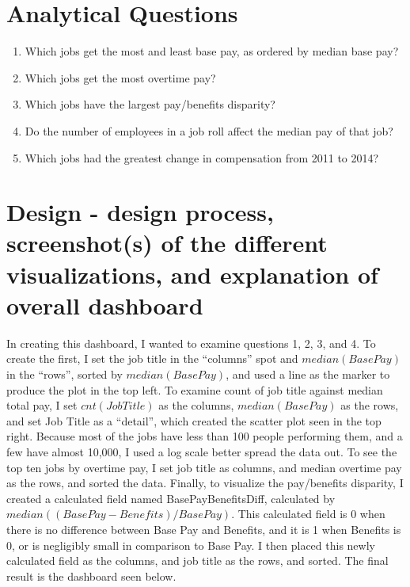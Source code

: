 \documentclass{article}
\begin{document}
\section{Analytical Questions}
\begin{enumerate}
    \item Which jobs get the most and least base pay, as ordered by median base pay?
    \item Which jobs get the most overtime pay?
    \item Which jobs have the largest pay/benefits disparity?
    \item Do the number of employees in a job roll affect the median pay of that job?
    \item Which jobs had the greatest change in compensation from 2011 to 2014?
\end{enumerate}

\section{Design - design process, screenshot(s) of the different visualizations, and
explanation of overall dashboard}
In creating this dashboard, I wanted to examine questions 1, 2, 3, and 4. To create the first, I set the job title in the “columns” spot and $median(Base Pay)$ in the ``rows'', sorted by $median(Base Pay)$, and used a line as the marker to produce the plot in the top left. To examine count of job title against median total pay, I set $cnt(Job Title)$ as the columns, $median(Base Pay)$ as the rows, and set Job Title as a ``detail'', which created the scatter plot seen in the top right. Because most of the jobs have less than 100 people performing them, and a few have almost 10,000, I used a log scale better spread the data out. To see the top ten jobs by overtime pay, I set job title as columns, and median overtime pay as the rows, and sorted the data. Finally, to visualize the pay/benefits disparity, I created a calculated field named BasePayBenefitsDiff, calculated by $median((Base Pay-Benefits)/Base Pay)$. This calculated field is 0 when there is no difference between Base Pay and Benefits, and it is 1 when Benefits is 0, or is negligibly small in comparison to Base Pay. I then placed this newly calculated field as the columns, and job title as the rows, and sorted. The final result is the dashboard seen below.
\end{document}

